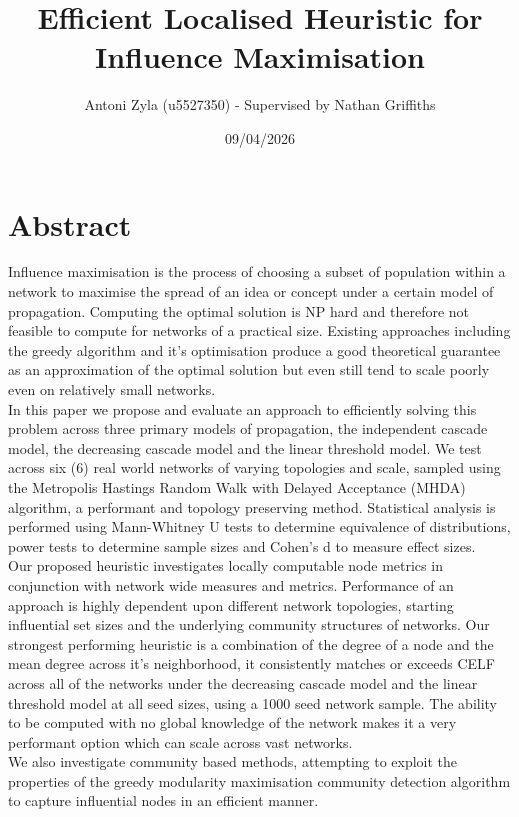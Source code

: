 \documentclass{article}
\title{Efficient Localised Heuristic for Influence Maximisation}
\author{Antoni Zyla (u5527350) - Supervised by Nathan Griffiths}
\date{09/04/2026}
\begin{document}
\maketitle
\tableofcontents

\newpage
\section{Abstract}

Influence maximisation is the process of choosing a subset of population within a network to maximise the spread of an idea or concept under a certain model of propagation.
Computing the optimal solution is NP hard and therefore not feasible to compute for networks of a practical size.
Existing approaches including the greedy algorithm and it's optimisation produce a good theoretical guarantee as an approximation of the optimal solution but even still tend to scale poorly even on relatively small networks.
\\

In this paper we propose and evaluate an approach to efficiently solving this problem across three primary models of propagation, the independent cascade model, the decreasing cascade model and the linear threshold model.
We test across six (6) real world networks of varying topologies and scale, sampled using the Metropolis Hastings Random Walk with Delayed Acceptance (MHDA) algorithm, a performant and topology preserving method.
Statistical analysis is performed using Mann-Whitney U tests to determine equivalence of distributions, power tests to determine sample sizes and Cohen's d to measure effect sizes.
\\

Our proposed heuristic investigates locally computable node metrics in conjunction with network wide measures and metrics.
Performance of an approach is highly dependent upon different network topologies, starting influential set sizes and the underlying community structures of networks.
Our strongest performing heuristic is a combination of the degree of a node and the mean degree across it's neighborhood, it consistently matches or exceeds CELF across all of the networks under the decreasing cascade model and the linear threshold model at all seed sizes, using a 1000 seed network sample.
The ability to be computed with no global knowledge of the network makes it a very performant option which can scale across vast networks.
\\

We also investigate community based methods, attempting to exploit the properties of the greedy modularity maximisation community detection algorithm to capture influential nodes in an efficient manner.
\\
\end{document}
